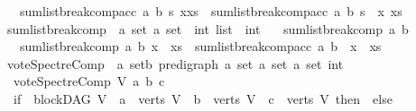 \begin{isabellebody}
\ \ {\isacharbar}{\kern0pt}\ {\isachardoublequoteopen}sumlist{\isacharunderscore}{\kern0pt}break{\isacharunderscore}{\kern0pt}comp{\isacharunderscore}{\kern0pt}acc\ a\ b\ s\ {\isacharparenleft}{\kern0pt}x{\isacharhash}{\kern0pt}xs{\isacharparenright}{\kern0pt}\ {\isacharequal}{\kern0pt}\ sumlist{\isacharunderscore}{\kern0pt}break{\isacharunderscore}{\kern0pt}comp{\isacharunderscore}{\kern0pt}acc\ a\ b\ {\isacharparenleft}{\kern0pt}s\ {\isacharplus}{\kern0pt}\ x{\isacharparenright}{\kern0pt}\ xs{\isachardoublequoteclose}\isanewline
\isanewline
{}\isamarkupfalse%
\ sumlist{\isacharunderscore}{\kern0pt}break{\isacharunderscore}{\kern0pt}comp\ {\isacharcolon}{\kern0pt}{\isacharcolon}{\kern0pt}\ {\isachardoublequoteopen}{\isacharprime}{\kern0pt}a\ set\ {\isasymRightarrow}{\isacharprime}{\kern0pt}a\ set\ {\isasymRightarrow}\ int\ list\ {\isasymRightarrow}\ int{\isachardoublequoteclose}\isanewline
\ \ \ {\isachardoublequoteopen}sumlist{\isacharunderscore}{\kern0pt}break{\isacharunderscore}{\kern0pt}comp\ a\ b\ {\isacharbrackleft}{\kern0pt}{\isacharbrackright}{\kern0pt}\ {\isacharequal}{\kern0pt}\ {}{\isachardoublequoteclose}\isanewline
\ \ {\isacharbar}{\kern0pt}\ {\isachardoublequoteopen}sumlist{\isacharunderscore}{\kern0pt}break{\isacharunderscore}{\kern0pt}comp\ a\ b\ {\isacharparenleft}{\kern0pt}x\ {\isacharhash}{\kern0pt}\ xs{\isacharparenright}{\kern0pt}\ {\isacharequal}{\kern0pt}\ sumlist{\isacharunderscore}{\kern0pt}break{\isacharunderscore}{\kern0pt}comp{\isacharunderscore}{\kern0pt}acc\ a\ b\ {}\ {\isacharparenleft}{\kern0pt}x\ {\isacharhash}{\kern0pt}\ xs{\isacharparenright}{\kern0pt}{\isachardoublequoteclose}\isanewline
\isanewline
{}\isamarkupfalse%
\ vote{\isacharunderscore}{\kern0pt}SpectreComp\ {\isacharcolon}{\kern0pt}{\isacharcolon}{\kern0pt}\ {\isachardoublequoteopen}{\isacharparenleft}{\kern0pt}{\isacharprime}{\kern0pt}a\ set{\isacharcomma}{\kern0pt}{\isacharprime}{\kern0pt}b{\isacharparenright}{\kern0pt}\ pre{\isacharunderscore}{\kern0pt}digraph\ {\isasymRightarrow}{\isacharprime}{\kern0pt}a\ set{\isasymRightarrow}\ {\isacharprime}{\kern0pt}a\ set{\isasymRightarrow}\ {\isacharprime}{\kern0pt}a\ set{\isasymRightarrow}\ int{\isachardoublequoteclose}\ \isanewline
\ \ \isanewline
\ \ {\isachardoublequoteopen}vote{\isacharunderscore}{\kern0pt}SpectreComp\ V\ a\ b\ c\ {\isacharequal}{\kern0pt}\ {\isacharparenleft}{\kern0pt}\isanewline
\ \ if\ {\isacharparenleft}{\kern0pt}{\isasymnot}\ blockDAG\ V\ {\isasymor}\ a\ {\isasymnotin}\ verts\ V\ {\isasymor}\ b\ {\isasymnotin}\ verts\ V\ {\isasymor}\ c\ {\isasymnotin}\ verts\ V{\isacharparenright}{\kern0pt}\ then\ {}\ else\ \isanewline

\end{isabellebody}

